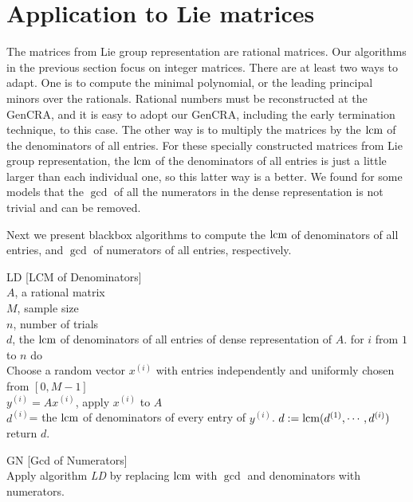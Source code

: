 \section {Application to Lie matrices}
The matrices from Lie group representation are rational matrices.
Our algorithms in the previous section focus on integer matrices.
There are at least two ways to adapt.
One is to compute the minimal polynomial, or the leading principal minors
over the rationals.
Rational numbers must be reconstructed at the GenCRA,
and it is easy to adopt our GenCRA, including the early termination technique,
to this case.
The other way is to multiply the matrices by the $\mbox{lcm}$ of
the denominators of all entries.
For these specially constructed matrices from Lie group representation, 
the $\mbox{lcm}$ of the denominators of all entries
is just a little larger than each individual one,
so this latter way is a better.
We found for some models that the $\gcd$ of all the
numerators in the dense representation is not trivial and  can be removed.

Next we present blackbox algorithms to compute the
$\mbox{lcm}$ of denominators of all entries, 
and $\gcd$ of numerators of all entries,
respectively.
\begin{algorithm} {LD [LCM of Denominators]}
\Inspec \\
$A$, a rational matrix\\
$M$, sample size\\
$n$, number of trials
\Outspec \\
$d$, the $\mbox{lcm}$ of denominators of all entries of dense representation of $A$.
\Stmt[1.]
for $i$ from $1$ to $n$ do\\
Choose a random vector $x^{(i)}$ with entries independently and uniformly chosen
from $[0, M-1]$\\
$y^{(i)} = A x^{(i)}$, apply $x^{(i)}$ to $A$\\
$d^{(i)}$= the $\mbox{lcm}$ of denominators of every entry of $y^{(i)}$.
\Stmt[2.]
$d := \mbox{lcm} (d^{(1)}, \cdots, d^{(i)})$
\Stmt[3.]
return $d$.
\end{algorithm}

\begin{algorithm}{GN [Gcd of Numerators]}
\\Apply algorithm {\em LD} by replacing $\mbox{lcm}$ with $\gcd$ and 
denominators with numerators.
\end{algorithm}

